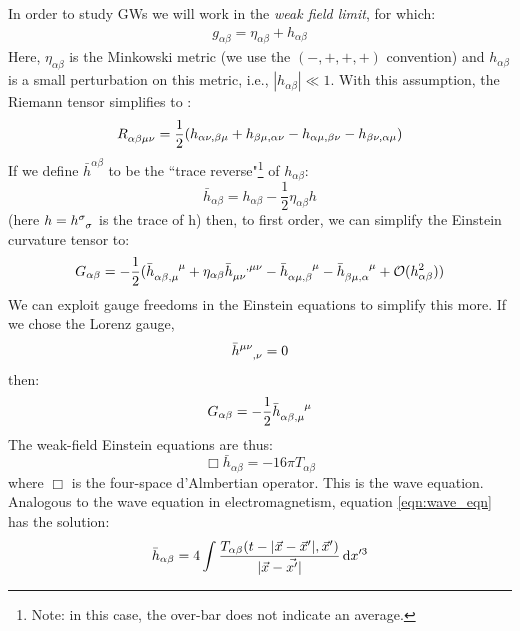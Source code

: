In order to study \acp{GW} we will work in the \emph{weak field limit}, for which:
\begin{align}
g_{\alpha\beta} = \eta_{\alpha\beta} + h_{\alpha\beta}
\end{align}
Here, $\eta_{\alpha\beta}$ is the Minkowski metric (we use the $(-,+,+,+)$ convention) and $h_{\alpha\beta}$ is a small perturbation on this metric, i.e., $|h_{\alpha\beta}| \ll 1$. With this assumption, the Riemann tensor simplifies to \cite{Schutz}:
\begin{equation}
R\indices{_{\alpha\beta\mu\nu}} = \frac{1}{2}(h_{\alpha\nu,\beta\mu} + h_{\beta\mu,\alpha\nu} - h_{\alpha\mu,\beta\nu} - h_{\beta\nu,\alpha\mu})
\end{equation}
If we define $\bar{h}^{\alpha\beta}$ to be the ``trace reverse"\footnote{Note: in this case, the over-bar does not indicate an average.} of $h_{\alpha\beta}$:
\begin{equation}
\bar{h}_{\alpha\beta} = h_{\alpha\beta} - \frac{1}{2}\eta_{\alpha\beta}h
\end{equation}
(here $h = h\indices{^\sigma_\sigma}$ is the trace of h) then, to first order, we can simplify the Einstein curvature tensor to:
\begin{equation}
G_{\alpha\beta} = -\frac{1}{2}(\bar{h}\indices{_{\alpha\beta,\mu}^\mu} + \eta_{\alpha\beta}\bar{h}\indices{_{\mu\nu}^{,\mu\nu}} - \bar{h}\indices{_{\alpha\mu,\beta}^\mu} - \bar{h}\indices{_{\beta\mu,\alpha}^\mu} + \mathcal{O}(h^2_{\alpha\beta}))
\end{equation}
We can exploit gauge freedoms in the Einstein equations to simplify this more. If we chose the Lorenz gauge,
\begin{equation}
\bar{h}\indices{^{\mu\nu}_{,\nu}} = 0
\end{equation}
then:
\begin{equation}
G_{\alpha\beta} = -\frac{1}{2}\bar{h}\indices{_{\alpha\beta,\mu}^\mu}
\end{equation}
The weak-field Einstein equations are thus:
\begin{equation}
\label{eqn:wave_eqn}
\Box\bar{h}_{\alpha\beta} = -16\pi T_{\alpha\beta}
\end{equation}
where $\Box$ is the four-space d'Almbertian operator. This is the wave equation. Analogous to the wave equation in electromagnetism, equation \ref{eqn:wave_eqn} has the solution:
\begin{equation}
\label{eqn:wave_sol-source}
\bar{h}_{\alpha\beta} = 4 \int \frac{T_{\alpha\beta}(t - |\vec{x}-\vec{x}'|, \vec{x}')}{|\vec{x} - \vec{x'}|} \d x'^3
\end{equation}

